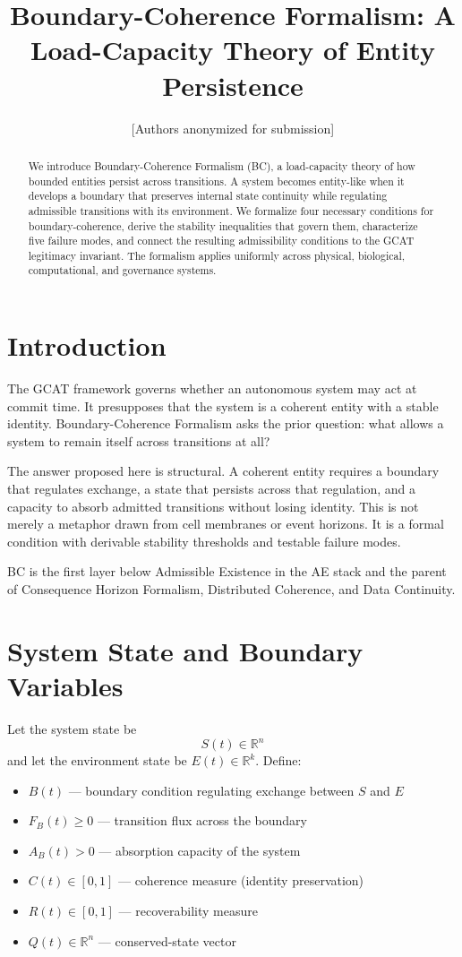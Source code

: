 \documentclass[letterpaper,10pt,conference]{ieeeconf}
\title{\bf Boundary-Coherence Formalism: A Load-Capacity Theory of Entity Persistence}
\author{[Authors anonymized for submission]}
\newcommand{\FB}{F_B}
\newcommand{\AB}{A_B}
\newcommand{\Coh}{C}
\newcommand{\Rec}{R}
\begin{document}
\maketitle
\thispagestyle{empty}
\pagestyle{empty}

\begin{abstract}
We introduce Boundary-Coherence Formalism (BC), a load-capacity theory of how bounded entities persist across transitions. A system becomes entity-like when it develops a boundary that preserves internal state continuity while regulating admissible transitions with its environment. We formalize four necessary conditions for boundary-coherence, derive the stability inequalities that govern them, characterize five failure modes, and connect the resulting admissibility conditions to the GCAT legitimacy invariant. The formalism applies uniformly across physical, biological, computational, and governance systems.
\end{abstract}

\section{Introduction}
The GCAT framework governs whether an autonomous system may act at commit time. It presupposes that the system is a coherent entity with a stable identity. Boundary-Coherence Formalism asks the prior question: what allows a system to remain itself across transitions at all?

The answer proposed here is structural. A coherent entity requires a boundary that regulates exchange, a state that persists across that regulation, and a capacity to absorb admitted transitions without losing identity. This is not merely a metaphor drawn from cell membranes or event horizons. It is a formal condition with derivable stability thresholds and testable failure modes.

BC is the first layer below Admissible Existence in the AE stack and the parent of Consequence Horizon Formalism, Distributed Coherence, and Data Continuity.

\section{System State and Boundary Variables}

Let the system state be
\[
S(t) \in \mathbb{R}^n
\]
and let the environment state be $E(t) \in \mathbb{R}^k$. Define:
\begin{itemize}
\item $B(t)$ --- boundary condition regulating exchange between $S$ and $E$
\item $\FB(t) \ge 0$ --- transition flux across the boundary
\item $\AB(t) > 0$ --- absorption capacity of the system
\item $\Coh(t) \in [0,1]$ --- coherence measure (identity preservation)
\item $\Rec(t) \in [0,1]$ --- recoverability measure
\item $Q(t) \in \mathbb{R}^n$ --- conserved-state vector
\end{itemize}
\end{document}
